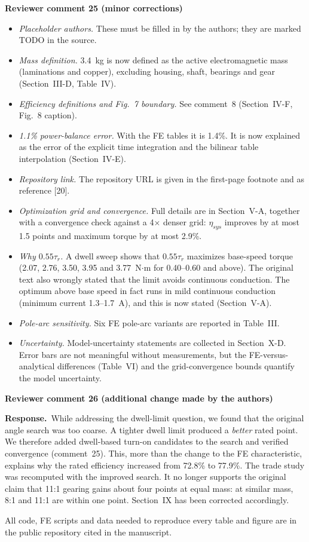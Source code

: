 \documentclass[10pt]{article}
\newcommand{\rev}[1]{\par\medskip\noindent\textbf{Reviewer comment #1}\par}
\newcommand{\resp}{\par\noindent\textcolor{blue!50!black}{\textbf{Response.}}~}
\begin{document}
\rev{25 (minor corrections)}
\begin{itemize}[nosep]
\item \emph{Placeholder authors.} These must be filled in by the authors; they
are marked TODO in the source.
\item \emph{Mass definition.} 3.4~kg is now defined as the active
electromagnetic mass (laminations and copper), excluding housing, shaft,
bearings and gear (Section~III-D, Table~IV).
\item \emph{Efficiency definitions and Fig.~7 boundary.} See comment~8
(Section~IV-F, Fig.~8 caption).
\item \emph{1.1\% power-balance error.} With the FE tables it is 1.4\%. It is
now explained as the error of the explicit time integration and the bilinear
table interpolation (Section~IV-E).
\item \emph{Repository link.} The repository URL is given in the first-page
footnote and as reference [20].
\item \emph{Optimization grid and convergence.} Full details are in
Section~V-A, together with a convergence check against a 4$\times$ denser
grid: $\eta_{sys}$ improves by at most 1.5 points and maximum torque by at most
2.9\%.
\item \emph{Why $0.55\tau_r$.} A dwell sweep shows that $0.55\tau_r$ maximizes
base-speed torque (2.07, 2.76, 3.50, 3.95 and 3.77~N$\cdot$m for 0.40--0.60 and
above). The original text also wrongly stated that the limit avoids continuous
conduction. The optimum above base speed in fact runs in mild continuous
conduction (minimum current 1.3--1.7~A), and this is now stated (Section~V-A).
\item \emph{Pole-arc sensitivity.} Six FE pole-arc variants are reported in
Table~III.
\item \emph{Uncertainty.} Model-uncertainty statements are collected in
Section~X-D. Error bars are not meaningful without measurements, but the
FE-versus-analytical differences (Table~VI) and the grid-convergence bounds
quantify the model uncertainty.
\end{itemize}

\rev{26 (additional change made by the authors)}
\resp While addressing the dwell-limit question, we found that the original
angle search was too coarse. A tighter dwell limit produced a \emph{better}
rated point. We therefore added dwell-based turn-on candidates to the search
and verified convergence (comment~25). This, more than the change to the FE
characteristic, explains why the rated efficiency increased from 72.8\% to
77.9\%. The trade study was recomputed with the improved search. It no longer
supports the original claim that 11:1 gearing gains about four points at
equal mass: at similar mass, 8:1 and 11:1 are within one point. Section~IX has
been corrected accordingly.

\bigskip
All code, FE scripts and data needed to reproduce every table and figure are
in the public repository cited in the manuscript.
\end{document}
